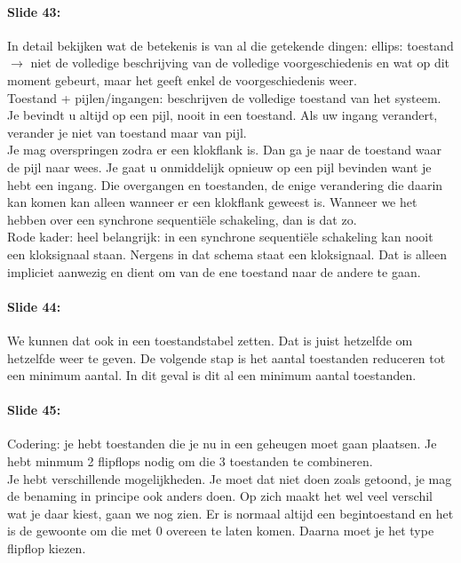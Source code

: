 \documentclass[10pt,a4paper]{book}
\begin{document}
\paragraph{Slide 43:} In detail bekijken wat de betekenis is van al die getekende dingen: ellips: toestand $\rightarrow$ niet de volledige beschrijving van de volledige voorgeschiedenis en wat op dit moment gebeurt, maar het geeft enkel de voorgeschiedenis weer.\\
Toestand + pijlen/ingangen: beschrijven de volledige toestand van het systeem. Je bevindt u altijd op een pijl, nooit in een toestand. Als uw ingang verandert, verander je niet van toestand maar van pijl.\\
Je mag overspringen zodra er een klokflank is. Dan ga je naar de toestand waar de pijl naar wees. Je gaat u onmiddelijk opnieuw op een pijl bevinden want je hebt een ingang. Die overgangen en toestanden, de enige verandering die daarin kan komen kan alleen wanneer er een klokflank geweest is. Wanneer we het hebben over een synchrone sequenti\"ele schakeling, dan is dat zo.\\
Rode kader: heel belangrijk: in een synchrone sequenti\"ele schakeling kan nooit een kloksignaal staan. Nergens in dat schema staat een kloksignaal. Dat is alleen impliciet aanwezig en dient om van de ene toestand naar de andere te gaan. 

\paragraph{Slide 44:} We kunnen dat ook in een toestandstabel zetten. Dat is juist hetzelfde om hetzelfde weer te geven. De volgende stap is het aantal toestanden reduceren tot een minimum aantal. In dit geval is dit al een minimum aantal toestanden.

\paragraph{Slide 45:} Codering: je hebt toestanden die je nu in een geheugen moet gaan plaatsen. Je hebt minmum 2 flipflops nodig om die 3 toestanden te combineren.\\
Je hebt verschillende mogelijkheden. Je moet dat niet doen zoals getoond, je mag de benaming in principe ook anders doen. Op zich maakt het wel veel verschil wat je daar kiest, gaan we nog zien. Er is normaal altijd een begintoestand en het is de gewoonte om die met 0 overeen te laten komen. Daarna moet je het type flipflop kiezen.
\end{document}
